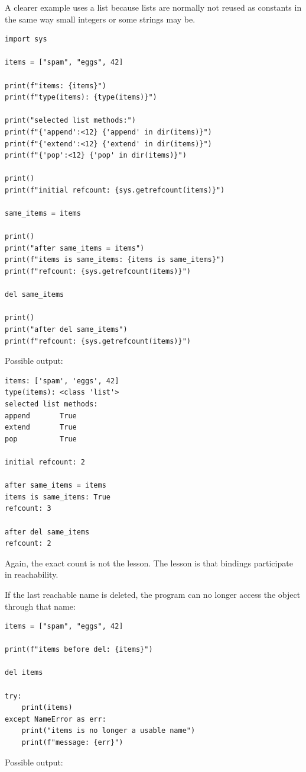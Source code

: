 A clearer example uses a list because lists are normally not reused as constants in the same way small integers or some strings may be.

\begin{verbatim}
import sys

items = ["spam", "eggs", 42]

print(f"items: {items}")
print(f"type(items): {type(items)}")

print("selected list methods:")
print(f"{'append':<12} {'append' in dir(items)}")
print(f"{'extend':<12} {'extend' in dir(items)}")
print(f"{'pop':<12} {'pop' in dir(items)}")

print()
print(f"initial refcount: {sys.getrefcount(items)}")

same_items = items

print()
print("after same_items = items")
print(f"items is same_items: {items is same_items}")
print(f"refcount: {sys.getrefcount(items)}")

del same_items

print()
print("after del same_items")
print(f"refcount: {sys.getrefcount(items)}")
\end{verbatim}

Possible output:

\begin{verbatim}
items: ['spam', 'eggs', 42]
type(items): <class 'list'>
selected list methods:
append       True
extend       True
pop          True

initial refcount: 2

after same_items = items
items is same_items: True
refcount: 3

after del same_items
refcount: 2
\end{verbatim}

Again, the exact count is not the lesson. The lesson is that bindings participate in reachability.

If the last reachable name is deleted, the program can no longer access the object through that name:

\begin{verbatim}
items = ["spam", "eggs", 42]

print(f"items before del: {items}")

del items

try:
    print(items)
except NameError as err:
    print("items is no longer a usable name")
    print(f"message: {err}")
\end{verbatim}

Possible output:


